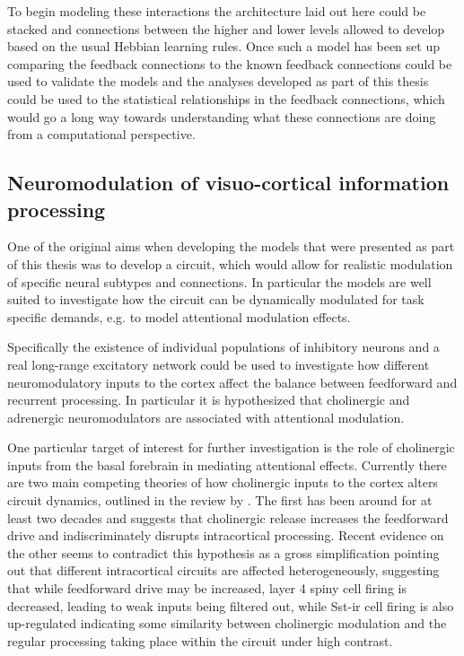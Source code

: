 To begin modeling these interactions the architecture laid out here
could be stacked and connections between the higher and lower levels
allowed to develop based on the usual Hebbian learning rules. Once
such a model has been set up comparing the feedback connections to the
known feedback connections could be used to validate the models and
the analyses developed as part of this thesis could be used to the
statistical relationships in the feedback connections, which would go
a long way towards understanding what these connections are doing from
a computational perspective.

\subsection{Neuromodulation of visuo-cortical information processing}

One of the original aims when developing the models that were
presented as part of this thesis was to develop a circuit, which would
allow for realistic modulation of specific neural subtypes and
connections. In particular the models are well suited to investigate
how the circuit can be dynamically modulated for task specific
demands, e.g. to model attentional modulation effects.

Specifically the existence of individual populations of inhibitory
neurons and a real long-range excitatory network could be used to
investigate how different neuromodulatory inputs to the cortex affect
the balance between feedforward and recurrent processing. In
particular it is hypothesized that cholinergic and adrenergic
neuromodulators are associated with attentional modulation.

One particular target of interest for further investigation is the
role of cholinergic inputs from the basal forebrain in mediating
attentional effects. Currently there are two main competing theories
of how cholinergic inputs to the cortex alters circuit dynamics,
outlined in the review by \cite{Thiele2013}. The first has been around
for at least two decades and suggests that cholinergic release
increases the feedforward drive and indiscriminately disrupts
intracortical processing. Recent evidence on the other seems to
contradict this hypothesis as a gross simplification pointing out that
different intracortical circuits are affected heterogeneously,
suggesting that while feedforward drive may be increased, layer 4
spiny cell firing is decreased, leading to weak inputs being filtered
out, while Sst-ir cell firing is also up-regulated indicating some
similarity between cholinergic modulation and the regular processing
taking place within the circuit under high contrast.

